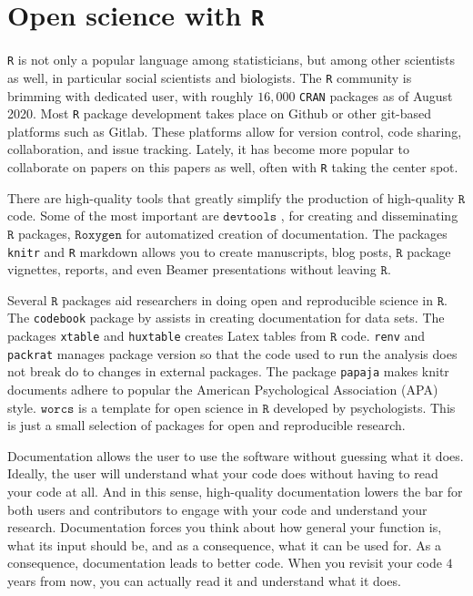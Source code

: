\section{Open science with \texttt{R}}

\texttt{R} is not only a popular language among statisticians, but among other scientists as well, in particular social scientists and biologists. The \texttt{R} community is brimming with dedicated user, with roughly $16,000$ \texttt{CRAN} packages as of August 2020. Most \texttt{R} package development takes place on Github or other git-based platforms such as Gitlab. These platforms allow for version control, code sharing, collaboration, and issue tracking. Lately, it has become more popular to collaborate on papers on this papers as well, often with \texttt{R} taking the center spot.

There are high-quality tools that greatly simplify the production of high-quality $\mathtt{R}$ code. Some of the most important are $\texttt{devtools}$ \parencite{devtools}, for creating and disseminating $\mathtt{R}$ packages, $\mathtt{Roxygen}$ \parencite{roxygen2} for automatized creation of documentation. The packages \texttt{knitr} \parencite{Xie2014} and \texttt{R} markdown allows you to create manuscripts, blog posts, $\mathtt{R}$ package vignettes, reports, and even Beamer presentations without leaving $\mathtt{R}$.

Several $\mathtt{R}$ packages aid researchers in doing open and reproducible science in $\mathtt{R}$. The \texttt{codebook} package by \textcite{Arslan2019-tg} assists in creating documentation for data sets. The packages \texttt{xtable} \parencite{xtable} and \texttt{huxtable} \parencite{huxtable} creates Latex tables from $\mathtt{R}$ code. \texttt{renv} \parencite{renv} and \texttt{packrat} \parencite{packrat} manages package version so that the code used to run the analysis does not break do to changes in external packages. The package \texttt{papaja} \parencite{papaja} makes knitr documents adhere to popular the American Psychological Association (APA) style. $\mathtt{worcs}$ \parencite{Van_Lissa2020-sb} is a template for open science in $\mathtt{R}$ developed by psychologists. This is just a small selection of packages for open and reproducible research.

Documentation allows the user to use the software without guessing what it does. Ideally, the user will understand what your code does without having to read your code at all. And in this sense, high-quality documentation lowers the bar for both users and contributors to engage with your code and understand your research. Documentation forces you think about how general your function is, what its input should be, and as a consequence, what it can be used for. As a consequence, documentation leads to better code. When you revisit your code $4$ years from now, you can actually read it and understand what it does. 

